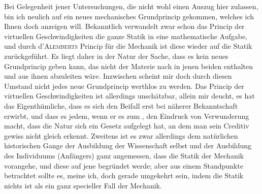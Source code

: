\noindent\hspace*{\parindent}Bei Gelegenheit jener Untersuchungen, die nicht wohl einen Auszug hier
zulassen, bin ich neulich auf ein neues mechanisches Grundprincip gekommen,
welches ich Ihnen doch anzeigen will. Bekanntlich verwandelt zwar schon
das Princip der virtuellen Geschwindigkeiten die ganze Statik in eine mathematische
Aufgabe, und durch d’\textsc{Alemberts} Princip für die Mechanik ist diese
wieder auf die Statik zurückgeführt. Es liegt daher in der Natur der Sache,
dass es kein neues Grundprincip geben kann, das nicht der Materie nach in
jenen beiden enthalten und aus ihnen abzuleiten wäre. Inzwischen scheint
mir doch durch diesen Umstand nicht jedes neue Grundprincip werthlos zu
werden. Das Princip der virtuellen Geschwindigkeiten ist allerdings unschätzbar,
allein mir deucht, es hat das Eigenthümliche, dass es sich den Beifall
erst bei näherer Bekanntschaft erwirbt, und dass es jedem, wenn er es zum
, den Eindruck von Verwunderung macht, dass die
Natur sich ein Gesetz aufgelegt hat, an dem man sein Creditiv gewiss
nicht gleich erkennt. Zweitens ist es zwar allerdings dem natürlichen historischen
Gange der Ausbildung der Wissenschaft selbst und der Ausbildung
des Individuums (Anfängers) ganz angemessen, dass die Statik der Mechanik
vorangehe, und diese auf jene begründet werde; aber aus einem 
Standpunkte betrachtet sollte es, meine ich, doch gerade umgekehrt sein,
indem die Statik nichts ist als ein ganz specieller Fall der Mechanik.

